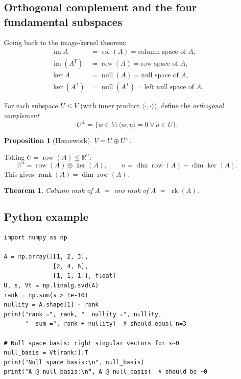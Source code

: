 \documentclass[11pt]{article}
\theoremstyle{definition}
\theoremstyle{plain}
\newtheorem{theorem}{Theorem}[section]
\newtheorem{proposition}{Proposition}[section]
\begin{document}
\subsection{Orthogonal complement and the four fundamental subspaces}

Going back to the image-kernel theorem:
\begin{align*}
  \operatorname{im}A &= \operatorname{col}(A) = \text{column space of }A,\\
  \operatorname{im}(A^T) &= \operatorname{row}(A) = \text{row space of }A,\\
  \ker A &= \operatorname{null}(A) = \text{null space of }A,\\
  \ker(A^T) &= \operatorname{null}(A^T) = \text{left null space of }A.
\end{align*}

\noindent
For each subspace $U\le V$ (with inner product $\langle\cdot,\cdot\rangle$),
define the \emph{orthogonal complement}
\[
  U^\perp = \{w\in V : \langle w, u\rangle = 0\ \forall\, u\in U\}.
\]

\begin{proposition}[Homework]
  $V = U\oplus U^\perp$.
\end{proposition}

\noindent
Taking $U = \operatorname{row}(A)\le\mathbb{R}^n$:
\[
  \mathbb{R}^n = \operatorname{row}(A) \oplus \ker(A),
  \qquad
  n = \dim\operatorname{row}(A) + \dim\ker(A).
\]
This gives $\operatorname{rank}(A) = \dim\operatorname{row}(A)$.

\begin{theorem}
  Column rank of $A$ $=$ row rank of $A$ $=$ $\operatorname{rk}(A)$.
\end{theorem}

\subsection{Python example}
\begin{lstlisting}
import numpy as np

A = np.array([[1, 2, 3],
              [2, 4, 6],
              [1, 1, 1]], float)
U, s, Vt = np.linalg.svd(A)
rank = np.sum(s > 1e-10)
nullity = A.shape[1] - rank
print("rank =", rank, "  nullity =", nullity,
      "  sum =", rank + nullity)  # should equal n=3

# Null space basis: right singular vectors for s~0
null_basis = Vt[rank:].T
print("Null space basis:\n", null_basis)
print("A @ null_basis:\n", A @ null_basis)  # should be ~0
\end{lstlisting}
\end{document}
